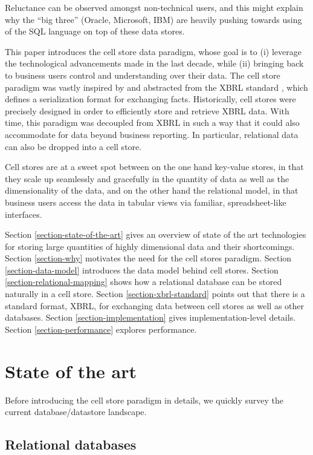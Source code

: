 \documentclass{acm_proc_article-sp}
\begin{document}
Reluctance can be observed amongst non-technical users, and this might explain why the ``big three'' (Oracle, Microsoft, IBM) are heavily pushing towards using of the SQL language \cite{Chamberlin1974} on top of these data stores.

This paper introduces the cell store data paradigm, whose goal is to (i) leverage the technological advancements made in the last decade, while (ii) bringing back to business users control and understanding over their data. The cell store paradigm was vastly inspired by and abstracted from the XBRL standard \cite{XBRL}, which defines a serialization format for exchanging facts. Historically, cell stores were precisely designed in order to efficiently store and retrieve XBRL data. With time, this paradigm was decoupled from XBRL in such a way that it could also accommodate for data beyond business reporting. In particular, relational data can also be dropped into a cell store.

Cell stores are at a sweet spot between on the one hand key-value stores, in that they scale up seamlessly and gracefully in the quantity of data as well as the dimensionality of the data, and on the other hand the relational model, in that business users access the data in tabular views via familiar, spreadsheet-like interfaces.

Section \ref{section-state-of-the-art} gives an overview of state of the art technologies for storing large quantities of highly dimensional data and their shortcomings. Section \ref{section-why} motivates the need for the cell stores paradigm. Section \ref{section-data-model} introduces the data model behind cell stores. Section \ref{section-relational-mapping} shows how a relational database can be stored naturally in a cell store. Section \ref{section-xbrl-standard} points out that there is a standard format, XBRL, for exchanging data between cell stores as well as other databases. Section \ref{section-implementation} gives implementation-level details. Section \ref{section-performance} explores performance.

\section{State of the art}
Before introducing the cell store paradigm in details, we quickly survey the current database/datastore landscape.

\label{section-state-of-the-art}

\subsection{Relational databases}
\end{document}
